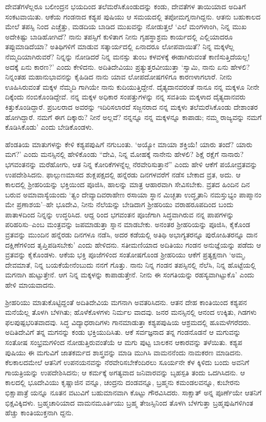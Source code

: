 ದೇವತೆಗಳೆಲ್ಲರೂ ಬಲೀಂದ್ರನ ಭಯದಿಂದ ತಲೆಮರೆಸಿಕೊಂಡುದನ್ನು ಕಂಡು, ದೇವತೆಗಳ ತಾಯಿಯಾದ ಅದಿತಿಗೆ ಸಂಕಟವಾಯಿತು. ಆಕೆಯ ಗಂಡನಾದ ಕಶ್ಯಪ ಪುಷಿಯು ಆ ಸಮಯದಲ್ಲಿ ತಪೋಮಗ್ನನಾಗಿದ್ದನು. ಆತನು ಬಹುಕಾಲದ ಮೇಲೆ ತಪಸ್ಸಿ ನಿಂದ ಎಚ್ಚೆತ್ತು, ಮಡದಿಯ ಬಾಡಿದ ಮುಖವನ್ನು ನೋಡುತ್ತಲೆ ‘ಎಲೆ ಮಂಗಳಾಂಗಿ, ನಿನ್ನ ಮುಖ ಅದೇಕಿಷ್ಟು ಬಾಡಿಹೋಗಿದೆ? ನಾನು ತಪಸ್ಸಿಗೆ ಕುಳಿತಾಗ ನೀನು ಗೃಹಸ್ಥಾಶ್ರಮ ಕಾರ್ಯದಲ್ಲಿ ಎಲ್ಲಿಯಾದರೂ ತಪ್ಪುಮಾಡಿದೆಯಾ? ಅತಿಥಿಗಳಿಗೆ ಮಾಡುವ ಸತ್ಕಾರ್ಯದಲ್ಲಿ ಏನಾದರೂ ಲೋಪವಾಯಿತೆ? ನಿನ್ನ ಮಕ್ಕಳೆಲ್ಲ ನೆಮ್ಮದಿಯಾಗಿರುವರೆ? ನಿನ್ನನ್ನು ನೋಡಿದರೆ ನಿನ್ನ ಮನಸ್ಸು ತುಂಬ ಕಳವಳಕ್ಕೆ ಈಡಾಗಿರುವಂತೆ ಕಾಣಿಸುತ್ತಿದೆಯಲ್ಲ! ಅದಕ್ಕೆ ಏನು ಕಾರಣ?’ ಎಂದು ಕೇಳಿದನು. ಅದಿತಿದೇವಿಯು ಪ್ರತ್ಯುತ್ತರವೀಯುತ್ತಾ ‘ಸ್ವಾಮಿ, ನಾನು ಏನು ಹೇಳಲಿ? ನಿನ್ನಂತಹ ಮಹಾನುಭಾವನನ್ನು ಕೈಹಿಡಿದ ನಾನು ಯಾವ ಲೋಪದೋಷಗಳಿಗೂ ಕಾರಣಳಾಗಲಾರೆ. ನೀನು ಊಹಿಸಿರುವಂತೆ ಮಕ್ಕಳ ನೆಮ್ಮದಿ ಗಾಗಿಯೇ ನಾನು ಕುದಿಯುತ್ತಿದ್ದೇನೆ. ದೈತ್ಯದಾನವರಂತೆ ನಾನೂ ನನ್ನ ಮಕ್ಕಳೂ ನೀನೇ ದಿಕ್ಕೆಂದು ನಂಬಿಕೊಂಡಿದ್ದೇವೆ. ನನ್ನ ಮಕ್ಕಳ ಅಧಿಕಾರ ಸಂಪತ್ತುಗಳನ್ನು ನನ್ನ ಸವತಿಯ ಮಕ್ಕಳಾದ ದೈತ್ಯದಾನವರು ಕಿತ್ತುಕೊಂಡಿದ್ದಾರೆ. ಪ್ರಬಲರಾದ ಅವರನ್ನು ಇದಿರಿಸಲಾರದೆ ಸಜ್ಜನರಾದ ನನ್ನ ಮಕ್ಕಳು ತಲೆಮರೆಸಿಕೊಂಡು ದೇಶಾಂತರ ಹೋಗಿದ್ದಾರೆ. ನಮಗೆ ಈಗ ದಿಕ್ಕಾರು? ನೀನೆ ಅಲ್ಲವೆ? ನನ್ನನ್ನೂ ನನ್ನ ಮಕ್ಕಳನ್ನೂ ಕಾಪಾಡು; ನಮ್ಮ ರಾಜ್ಯವನ್ನು ನಮಗೆ ಕೊಡಿಸಿಕೊಡು’ ಎಂದು ಬೇಡಿಕೊಂಡಳು.

ಹೆಂಡತಿಯ ಮಾತುಗಳನ್ನು ಕೇಳಿ ಕಶ್ಯಪಪುಷಿಗೆ ನಗುಬಂತು. ‘ಅಯ್ಯೋ ಮಾಯಾ ಶಕ್ತಿಯೆ! ಯಾರು ತಂದೆ? ಯಾರು ಮಗ?’ ಎಂದು ಮನಸ್ಸಿನಲ್ಲಿ ಹೇಳಿಕೊಂಡು “ದೇವಿ, ನಿನ್ನ ಮೋಹಕ್ಕೆ ನಾನೇನು ಹೇಳಲಿ? ಶಿಕ್ಷೆ ರಕ್ಷೆಗೆ ನಾನಾರು? ಭಗವಂತನನ್ನು ಮರೆಹೋಗು, ಆತ ನಿನ್ನ ಕೋರಿಕೆಗಳನ್ನೆಲ್ಲ ನೆರವೇರಿಸುತ್ತಾನೆ” ಎಂದು ಹೇಳಿ ಆಕೆಗೆ ಪಯೋವ್ರತವನ್ನು ಉಪದೇಶಿಸಿದನು. ಫಾಲ್ಗುಣಮಾಸದ ಶುಕ್ಲಪಕ್ಷದಲ್ಲಿ ಹನ್ನೆರಡು ದಿನಗಳವರೆಗೆ ನಡೆಸ ಬೇಕಾದ ವ್ರತ, ಅದು. ಆ ಕಾಲದಲ್ಲಿ ಶ್ರೀಹರಿಯನ್ನು ಭಕ್ತಿಯಿಂದ ಪೂಜಿಸಿ, ಹಾಲನ್ನು ಮಾತ್ರ ಆಹಾರವಾಗಿ ಸೇವಿಸಬೇಕು. ವ್ರತದ ಹಿಂದಿನ ದಿನ ಬರುವ ಅಮಾವಾಸ್ಯೆಯಂದು ‘ತ್ವಂ ದೇವ್ಯಾದಿವರಾಹೇಣ ರಸಾಯಾ ಸ್ಥಾನ ಮಿಚ್ಛತಾ ಉದ್ಧೃತಾನಿ ನಮಸ್ತುಭ್ಯಂ ಪಾಪ್ಮಾನಂ ಮೇ ಪ್ರಣಾಶಯ’–ಹೇ ಭೂದೇವಿ, ನೀನು ನೆಲೆಯನ್ನು ಬೇಡಿದಾಗ ಶ್ರೀಹರಿಯು ವರಾಹರೂಪದಿಂದ ಬಂದು ಪಾತಾಳದಿಂದ ನಿನ್ನನ್ನು ಉದ್ಧರಿಸಿದ. ಆದ್ದ ರಿಂದ ಭಗವಂತನ ಪೂಜೆಗಾಗಿ ಸಿದ್ಧವಾಗಿರುವ ನನ್ನ ಪಾಪಗಳನ್ನು ಪರಿಹರಿಸು–ಎಂಬ ಮಂತ್ರವನ್ನು ಜಪಮಾಡುತ್ತಾ ಸ್ನಾನ ಮಾಡಬೇಕು. ಅನಂತರ ಶ್ರೀಹರಿಯನ್ನು ಪೂಜಿಸಿ, ಕೈಕೊಂಡ ವ್ರತವನ್ನು ಮುಂದಿನ ಹನ್ನೆರಡು ದಿನಗಳೂ ನಡೆಸಿ, ಅದರ ಕಡೆಯಲ್ಲಿ ಅತಿಥಿ ಅಭಾಗ್ಯತರನ್ನೂ ಪುರೋಹಿತರನ್ನೂ ದಾನ ದಕ್ಷಿಣೆಗಳಿಂದ ತೃಪ್ತಿಪಡಿಸಬೇಕು’ ಎಂದು ಹೇಳಿದನು. ಸತೀಮಣಿಯಾದ ಅದಿತಿಯು ಗಂಡನ ಅನುಜ್ಞೆಯನ್ನು ಪಡೆದು ಆ ವ್ರತವನ್ನು ಕೈಕೊಂಡಳು. ಆಕೆಯ ಭಕ್ತಿ ಪೂಜೆಗಳಿಂದ ಸಂತೋಷಗೊಂಡ ಶ್ರೀಹರಿಯು ಆಕೆಗೆ ಪ್ರತ್ಯಕ್ಷನಾಗಿ ‘ಅಮ್ಮ, ದೇವಮಾತೆ, ನಿನ್ನ ಬಯಕೆಯೇನೆಂಬುದು ನನಗೆ ಗೊತ್ತು. ನಾನು ನಿನ್ನ ಗಂಡನ ತಪಸ್ಸಿನಲ್ಲಿ ನೆಲೆಸಿ, ನಿನ್ನ ಹೊಟ್ಟೆಯಲ್ಲಿ ಮಗನಾಗಿ ಹುಟ್ಟುತ್ತೇನೆ. ಆಗ ನಿನ್ನ ಮಕ್ಕಳನ್ನು ಕಾಪಾಡುತ್ತೇನೆ. ನೀನು ಈ ಸಂಗತಿಯನ್ನು ರಹಸ್ಯವಾಗಿಟ್ಟುಕೊ’ ಎಂದು ಹೇಳಿ ಮಾಯವಾದನು.

ಶ್ರೀಹರಿಯು ಮಾತುಕೊಟ್ಟಿದ್ದಂತೆ ಅದಿತಿದೇವಿಯ ಮಗನಾಗಿ ಅವತರಿಸಿದನು. ಆತನ ದೇಹ ಕಾಂತಿಯಿಂದ ಕಶ್ಯಪನ ಮನೆಯೆಲ್ಲ ತೊಳಗಿ ಬೆಳಗಿತು; ಹೊಳೆಕೊಳಗಳು ನಿರ್ಮಲ ವಾದವು. ಜನರ ಮನಸ್ಸಿನಲ್ಲಿ ಆನಂದ ಉಕ್ಕಿತು, ಗಿಡಗಳು ಫಲಪುಷ್ಪಭರಿತವಾದವು. ಸಿದ್ಧ ವಿದ್ಯಾಧರಾದಿಗಳು ಗಾನಮಾಡುತ್ತಾ ಕಶ್ಯಪಪುಷಿಯ ಆಶ್ರಮದಲ್ಲಿ ಹೂಮಳೆಗರೆದರು. ಅದಿತಿದೇವಿಗೆ ತನ್ನ ಮಗನನ್ನು ಕಂಡು ಭಕ್ತಿಯುದಿಸಿತು. ಆಕೆ ಸರ್ವಜ್ಞನಾದ ತನ್ನ ಗಂಡನೊಡನೆ ಆ ಮಗುವನ್ನು ಸಂತೋಷ ಸಂಭ್ರಮಗಳಿಂದ ನೋಡುತ್ತಿರುವಂತೆಯೆ ಆ ಮಗು ಪುಟ್ಟ ಬಾಲಕನ ಆಕಾರವನ್ನು ತಳೆಯಿತು. ಕಶ್ಯಪ ಪುಷಿಯು ಈ ಮಗುವಿಗೆ ಜಾತಕರ್ಮದ ಶಾಸ್ತ್ರವನ್ನು ಮಾಡಿ ಮುಗಿಸಿ ವಾಮನನೆಂದು ನಾಮಕರಣ ಮಾಡಿದನು. ಕೆಲಕಾಲದಮೇಲೆ ಆತನಿಗೆ ಉಪನಯನವನ್ನು ನೆರವೇರಿಸಬೇಕೆಂದಿರಲು ಸೂರ್ಯನೇ ಕೆಳ ಕ್ಕಿಳಿದು ಬಂದು ಅವನಿಗೆ ಗಾಯತ್ರಿಯನ್ನು ಉಪದೇಶಿಸಿದನು; ಆ ಕರ್ಮಕ್ಕೆ ಅಗತ್ಯವಾದ ಜನಿವಾರವನ್ನು ಬೃಹಸ್ಪತಿ ತಂದು ಒದಗಿಸಿದನು. ಆ ಕಾಲದಲ್ಲಿ ಭೂದೇವಿಯು ಕೃಷ್ಣಾಜಿನ ವನ್ನೂ, ಚಂದ್ರನು ದಂಡವನ್ನೂ, ಬ್ರಹ್ಮನು ಕಮಂಡಲವನ್ನೂ, ಕುಬೇರನು ಭಿಕ್ಷಾಪಾತ್ರೆ ಯನ್ನೂ ನೂತನ ವಟುವಿಗೆ ಬಹುಮಾನವಾಗಿ ಕೊಟ್ಟು ಗೌರವಿಸಿದರು. ಸಾಕ್ಷಾತ್ ಅನ್ನ ಪೂರ್ಣೆಯೇ ಆತನಿಗೆ ಭಿಕ್ಷವಿಕ್ಕಿದಳು. ಬ್ರಹ್ಮಚಾರಿಯಾದ ವಾಮನಮೂರ್ತಿಯು ಬ್ರಹ್ಮ ತೇಜಸ್ಸಿನಿಂದ ತೊಳಗಿ ಬೆಳಗುತ್ತಾ ಬ್ರಹ್ಮಪುಷಿಗಳಿಗಿಂತ ಹೆಚ್ಚು ಕಾಂತಿಯುಕ್ತನಾಗಿ ದ್ದನು.

